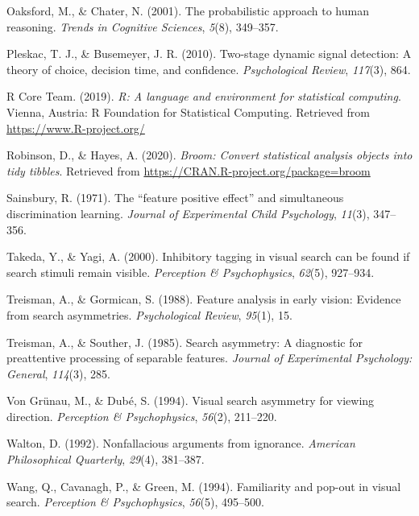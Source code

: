 \documentclass[
  english,
  man,floatsintext]{apa6}
\begin{document}
\leavevmode\hypertarget{ref-oaksford2001probabilistic}{}%
Oaksford, M., \& Chater, N. (2001). The probabilistic approach to human reasoning. \emph{Trends in Cognitive Sciences}, \emph{5}(8), 349--357.

\leavevmode\hypertarget{ref-pleskac2010two}{}%
Pleskac, T. J., \& Busemeyer, J. R. (2010). Two-stage dynamic signal detection: A theory of choice, decision time, and confidence. \emph{Psychological Review}, \emph{117}(3), 864.

\leavevmode\hypertarget{ref-R-base}{}%
R Core Team. (2019). \emph{R: A language and environment for statistical computing}. Vienna, Austria: R Foundation for Statistical Computing. Retrieved from \url{https://www.R-project.org/}

\leavevmode\hypertarget{ref-R-broom}{}%
Robinson, D., \& Hayes, A. (2020). \emph{Broom: Convert statistical analysis objects into tidy tibbles}. Retrieved from \url{https://CRAN.R-project.org/package=broom}

\leavevmode\hypertarget{ref-sainsbury1971feature}{}%
Sainsbury, R. (1971). The ``feature positive effect'' and simultaneous discrimination learning. \emph{Journal of Experimental Child Psychology}, \emph{11}(3), 347--356.

\leavevmode\hypertarget{ref-takeda2000inhibitory}{}%
Takeda, Y., \& Yagi, A. (2000). Inhibitory tagging in visual search can be found if search stimuli remain visible. \emph{Perception \& Psychophysics}, \emph{62}(5), 927--934.

\leavevmode\hypertarget{ref-treisman1988feature}{}%
Treisman, A., \& Gormican, S. (1988). Feature analysis in early vision: Evidence from search asymmetries. \emph{Psychological Review}, \emph{95}(1), 15.

\leavevmode\hypertarget{ref-treisman1985search}{}%
Treisman, A., \& Souther, J. (1985). Search asymmetry: A diagnostic for preattentive processing of separable features. \emph{Journal of Experimental Psychology: General}, \emph{114}(3), 285.

\leavevmode\hypertarget{ref-von1994visual}{}%
Von Grünau, M., \& Dubé, S. (1994). Visual search asymmetry for viewing direction. \emph{Perception \& Psychophysics}, \emph{56}(2), 211--220.

\leavevmode\hypertarget{ref-walton1992nonfallacious}{}%
Walton, D. (1992). Nonfallacious arguments from ignorance. \emph{American Philosophical Quarterly}, \emph{29}(4), 381--387.

\leavevmode\hypertarget{ref-wang1994familiarity}{}%
Wang, Q., Cavanagh, P., \& Green, M. (1994). Familiarity and pop-out in visual search. \emph{Perception \& Psychophysics}, \emph{56}(5), 495--500.
\end{document}
